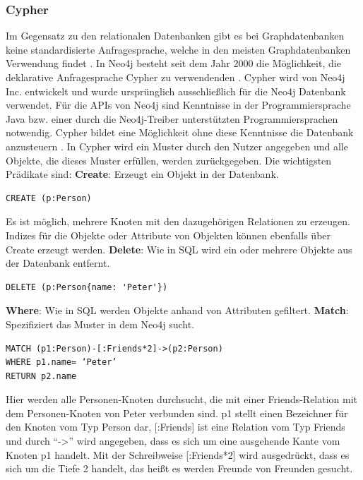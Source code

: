 \subsubsection{Cypher}
Im Gegensatz zu den relationalen Datenbanken gibt es bei Graphdatenbanken keine standardisierte Anfragesprache, welche in den meisten Graphdatenbanken Verwendung findet \parencite{han2011survey}. In Neo4j besteht seit dem Jahr 2000 die Möglichkeit, die deklarative Anfragesprache Cypher zu verwendenden  \parencite{francis2018cypher}. Cypher wird von Neo4j Inc. entwickelt und wurde ursprünglich ausschließlich für die Neo4j Datenbank verwendet. Für die APIs von Neo4j sind Kenntnisse in der Programmiersprache Java bzw. einer durch die Neo4j-Treiber unterstützten Programmiersprachen notwendig. Cypher bildet eine Möglichkeit ohne diese Kenntnisse die  Datenbank anzusteuern \parencite{vukotic2015neo4j}. In Cypher wird ein Muster durch den Nutzer angegeben und alle Objekte, die dieses Muster erfüllen, werden zurückgegeben. Die wichtigsten  Prädikate sind: \newline
\textbf{Create}: Erzeugt ein Objekt in der Datenbank. 
\begin{Verbatim}[frame=single]
CREATE (p:Person)
\end{Verbatim}
Es ist möglich, mehrere Knoten mit den dazugehörigen Relationen zu erzeugen. Indizes für die Objekte oder Attribute von Objekten können ebenfalls über Create erzeugt werden.\newline
\textbf{Delete}: Wie in SQL  wird ein  oder mehrere Objekte aus der Datenbank entfernt.
\begin{Verbatim}[frame=single]
DELETE (p:Person{name: 'Peter'})  
\end{Verbatim}
\textbf{Where}: Wie in SQL werden Objekte anhand von Attributen gefiltert. \newline
\textbf{Match}: Spezifiziert das Muster in dem Neo4j sucht.
\begin{Verbatim}[frame=single]
MATCH (p1:Person)-[:Friends*2]->(p2:Person) 
WHERE p1.name= ‘Peter’ 
RETURN p2.name
\end{Verbatim}
Hier werden alle Personen-Knoten durchsucht, die mit einer Friends-Relation mit dem Personen-Knoten von Peter verbunden sind. p1 stellt einen Bezeichner für den Knoten vom Typ Person dar, [:Friends] ist eine Relation vom Typ Friends und durch “->” wird angegeben, dass es sich um eine ausgehende Kante vom Knoten p1 handelt. Mit der Schreibweise [:Friends*2] wird ausgedrückt, dass es sich um die Tiefe 2 handelt, das heißt es werden Freunde von Freunden gesucht. \newline
